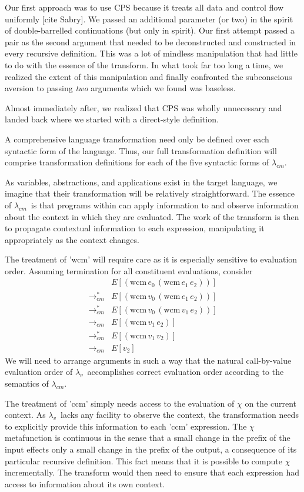\documentclass{llncs}
\newcommand{\cm}[0]{$\lambda_{cm}$}
\newcommand{\lv}[0]{$\lambda_v$}
\newcommand{\wcm}[2]{(\mathrm{wcm}\,#1\,#2)}
\newcommand{\cmrr}[0]{\rightarrow_{cm}}
\newcommand{\cmrrs}[0]{\rightarrow_{cm}^{*}}
\begin{document}
Our first approach was to use CPS because it treats all data and control flow uniformly [cite Sabry]. We passed an additional parameter (or two) in the spirit of double-barrelled continuations (but only in spirit). Our first attempt passed a pair as the second argument that needed to be deconstructed and constructed in every recursive definition. This was a lot of mindless manipulation that had little to do with the essence of the transform. In what took far too long a time, we realized the extent of this manipulation and finally confronted the subconscious aversion to passing \emph{two} arguments which we found was baseless.

Almost immediately after, we realized that CPS was wholly unnecessary and landed back where we started with a direct-style definition.


A comprehensive language transformation need only be defined over each syntactic form of the language. Thus, our full transformation definition will comprise transformation definitions for each of the five syntactic forms of \cm.

As variables, abstractions, and applications exist in the target language, we imagine that their transformation will be relatively straightforward. The essence of \cm\ is that programs within can apply information to and observe information about the context in which they are evaluated. The work of the transform is then to propagate contextual information to each expression, manipulating it appropriately as the context changes.

The treatment of \scheme'wcm' will require care as it is especially sensitive to evaluation order. Assuming termination for all constituent evaluations, consider
\begin{align*}
       &E[\wcm{e_0}{\wcm{e_1}{e_2}}]\\
\cmrrs &E[\wcm{v_0}{\wcm{e_1}{e_2}}]\\
\cmrrs &E[\wcm{v_0}{\wcm{v_1}{e_2}}]\\
\cmrr  &E[\wcm{v_1}{e_2}]\\
\cmrrs &E[\wcm{v_1}{v_2}]\\
\cmrr  &E[v_2]
\end{align*}
We will need to arrange arguments in such a way that the natural call-by-value evaluation order of \lv\ accomplishes correct evaluation order according to the semantics of \cm.

The treatment of \scheme'ccm' simply needs access to the evaluation of $\chi$ on the current context. As \lv\ lacks any facility to observe the context, the transformation needs to explicitly provide this information to each \scheme'ccm' expression. The $\chi$ metafunction is continuous in the sense that a small change in the prefix of the input effects only a small change in the prefix of the output, a consequence of its particular recursive definition. This fact means that it is possible to compute $\chi$ incrementally. The transform would then need to ensure that each expression had access to information about its own context.
\end{document}
